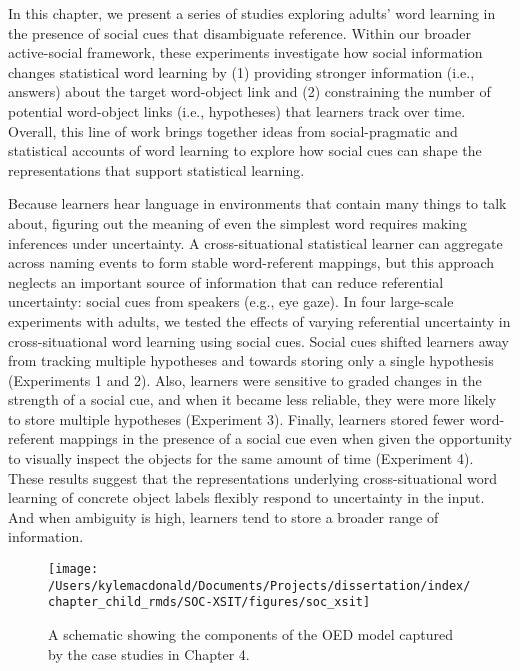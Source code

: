 \documentclass[oneside]{report}
\begin{document}
In this chapter, we present a series of studies exploring adults' word
learning in the presence of social cues that disambiguate reference.
Within our broader active-social framework, these experiments
investigate how social information changes statistical word learning by
(1) providing stronger information (i.e., answers) about the target
word-object link and (2) constraining the number of potential
word-object links (i.e., hypotheses) that learners track over time.
Overall, this line of work brings together ideas from social-pragmatic
and statistical accounts of word learning to explore how social cues can
shape the representations that support statistical learning.

Because learners hear language in environments that contain many things
to talk about, figuring out the meaning of even the simplest word
requires making inferences under uncertainty. A cross-situational
statistical learner can aggregate across naming events to form stable
word-referent mappings, but this approach neglects an important source
of information that can reduce referential uncertainty: social cues from
speakers (e.g., eye gaze). In four large-scale experiments with adults,
we tested the effects of varying referential uncertainty in
cross-situational word learning using social cues. Social cues shifted
learners away from tracking multiple hypotheses and towards storing only
a single hypothesis (Experiments 1 and 2). Also, learners were sensitive
to graded changes in the strength of a social cue, and when it became
less reliable, they were more likely to store multiple hypotheses
(Experiment 3). Finally, learners stored fewer word-referent mappings in
the presence of a social cue even when given the opportunity to visually
inspect the objects for the same amount of time (Experiment 4). These
results suggest that the representations underlying cross-situational
word learning of concrete object labels flexibly respond to uncertainty
in the input. And when ambiguity is high, learners tend to store a
broader range of information.
\begin{figure}[!t]

{\centering \texttt{[image: /Users/kylemacdonald/Documents/Projects/dissertation/index/chapter\_child\_rmds/SOC-XSIT/figures/soc\_xsit]} 

}

\caption[Overview of Chapter 4.]{A schematic showing the components of the OED model captured by the case studies in Chapter 4.}\label{fig:schematic-soc-xsit}
\end{figure}
\end{document}
